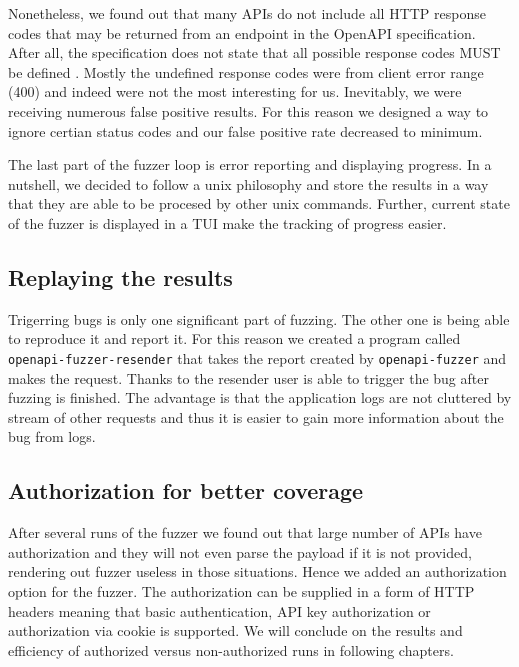 Nonetheless, we found out that many APIs do not include all HTTP response codes that may be returned from an endpoint in the OpenAPI specification. After all, the specification does not state that all possible response codes MUST be defined \cite{openapi2020github}. Mostly the undefined response codes were from client error range (400) and indeed were not the most interesting for us. Inevitably, we were receiving numerous false positive results. For this reason we designed a way to ignore certian status codes and our false positive rate decreased to minimum.

The last part of the fuzzer loop is error reporting and displaying progress. In a nutshell, we decided to follow a unix philosophy and store the results in a way that they are able to be procesed by other unix commands. Further, current state of the fuzzer is displayed in a TUI make the tracking of progress easier.

\subsection{Replaying the results}
Trigerring bugs is only one significant part of fuzzing. The other one is being able to reproduce it and report it. For this reason we created a program called \newline \texttt{openapi-fuzzer-resender} that takes the report created by \texttt{openapi-fuzzer} and makes the request. Thanks to the resender user is able to trigger the bug after fuzzing is finished. The advantage is that the application logs are not cluttered by stream of other requests and thus it is easier to gain more information about the bug from logs.

\subsection{Authorization for better coverage}
After several runs of the fuzzer we found out that large number of APIs have authorization and they will not even parse the payload if it is not provided, rendering out fuzzer useless in those situations. Hence we added an authorization option for the fuzzer. The authorization can be supplied in a form of HTTP headers meaning that basic authentication, API key authorization or authorization via cookie is supported. We will conclude on the results and efficiency of authorized versus non-authorized runs in following chapters.
